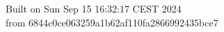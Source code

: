{\noindent Built on Sun Sep 15 16:32:17 CEST 2024} \\ 
 {\noindent from 6844c0ce063259a1b62af110fa2866992435bce7}
